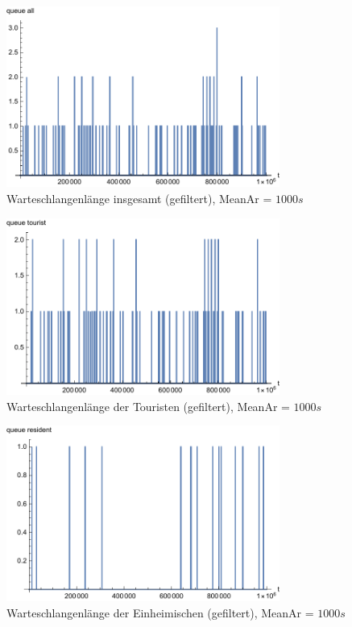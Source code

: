 \begin{figure}[htpb]
	\centering
	\includegraphics[width=0.8\textwidth]{abbildungen/1_Phone_VIP/Arrival_1000_Serve_100_dur_1000000_Skip_0/QueueStepPlotAllFiltered.pdf}
	\caption{Warteschlangenlänge insgesamt (gefiltert), MeanAr = $1000s$}
	\label{fig:QSPALL1000}
\end{figure}

\begin{figure}[htpb]
	\centering
	\includegraphics[width=0.8\textwidth]{abbildungen/1_Phone_VIP/Arrival_1000_Serve_100_dur_1000000_Skip_0/QueueStepPlotTouristFiltered.pdf}
	\caption{Warteschlangenlänge der Touristen (gefiltert), MeanAr = $1000s$}
	\label{fig:QSPTOURI1000}
\end{figure}

\begin{figure}[htpb]
	\centering
	\includegraphics[width=0.8\textwidth]{abbildungen/1_Phone_VIP/Arrival_1000_Serve_100_dur_1000000_Skip_0/QueueStepPlotResidentFiltered.pdf}
	\caption{Warteschlangenlänge der Einheimischen (gefiltert), MeanAr = $1000s$}
	\label{fig:QSPVIP1000}
\end{figure}


